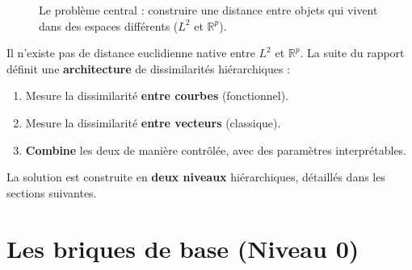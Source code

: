 \documentclass[11pt, a4paper]{article}
\newcommand{\R}{\mathbb{R}}
\begin{document}
\begin{figure}[H]
\centering
{}
\caption{Le problème central : construire une distance entre objets
qui vivent dans des espaces différents ($L^2$ et $\R^p$).}
\end{figure}

Il n'existe pas de distance euclidienne native entre $L^2$ et $\mathbb{R}^p$.
La suite du rapport définit une \textbf{architecture} de dissimilarités
hiérarchiques :

\begin{enumerate}[nosep]
  \item Mesure la dissimilarité \textbf{entre courbes} (fonctionnel).
  \item Mesure la dissimilarité \textbf{entre vecteurs} (classique).
  \item \textbf{Combine} les deux de manière contrôlée, avec des paramètres
    interprétables.
\end{enumerate}

La solution est construite en \textbf{deux niveaux} hiérarchiques, détaillés
dans les sections suivantes.

\newpage
\section{Les briques de base (Niveau 0)}
\end{document}
